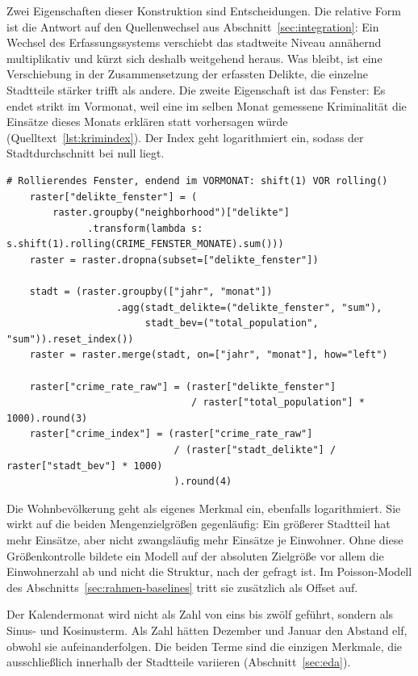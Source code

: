Zwei Eigenschaften dieser Konstruktion sind Entscheidungen. Die relative Form
ist die Antwort auf den Quellenwechsel aus Abschnitt~\ref{sec:integration}: Ein
Wechsel des Erfassungssystems verschiebt das stadtweite Niveau annähernd
multiplikativ und kürzt sich deshalb weitgehend heraus. Was bleibt, ist eine
Verschiebung in der Zusammensetzung der erfassten Delikte, die einzelne
Stadtteile stärker trifft als andere. Die zweite Eigenschaft ist das Fenster:
Es endet strikt im Vormonat, weil eine im selben Monat gemessene Kriminalität
die Einsätze dieses Monats erklären statt vorhersagen würde
(Quelltext~\ref{lst:krimindex}). Der Index geht logarithmiert ein, sodass der
Stadtdurchschnitt bei null liegt.

\begin{lstlisting}[style=pythonstil,
  label={lst:krimindex},
  caption={Relativer Kriminalitätsindex je Stadtteil und Monat
           (\texttt{prep/s1\_daten.py}, Z.~465--488, gekürzt)}]
    # Rollierendes Fenster, endend im VORMONAT: shift(1) VOR rolling()
    raster["delikte_fenster"] = (
        raster.groupby("neighborhood")["delikte"]
              .transform(lambda s: s.shift(1).rolling(CRIME_FENSTER_MONATE).sum()))
    raster = raster.dropna(subset=["delikte_fenster"])

    stadt = (raster.groupby(["jahr", "monat"])
                   .agg(stadt_delikte=("delikte_fenster", "sum"),
                        stadt_bev=("total_population", "sum")).reset_index())
    raster = raster.merge(stadt, on=["jahr", "monat"], how="left")

    raster["crime_rate_raw"] = (raster["delikte_fenster"]
                                / raster["total_population"] * 1000).round(3)
    raster["crime_index"] = (raster["crime_rate_raw"]
                             / (raster["stadt_delikte"] / raster["stadt_bev"] * 1000)
                             ).round(4)
\end{lstlisting}

Die Wohnbevölkerung geht als eigenes Merkmal ein, ebenfalls logarithmiert. Sie
wirkt auf die beiden Mengenzielgrößen gegenläufig: Ein größerer Stadtteil hat
mehr Einsätze, aber nicht zwangsläufig mehr Einsätze je Einwohner. Ohne diese
Größenkontrolle bildete ein Modell auf der absoluten Zielgröße vor allem die
Einwohnerzahl ab und nicht die Struktur, nach der gefragt ist. Im
Poisson-Modell des Abschnitts~\ref{sec:rahmen-baselines} tritt sie zusätzlich
als Offset auf.

Der Kalendermonat wird nicht als Zahl von eins bis zwölf geführt, sondern als
Sinus- und Kosinusterm. Als Zahl hätten Dezember und Januar den Abstand elf,
obwohl sie aufeinanderfolgen. Die beiden Terme sind die einzigen Merkmale, die
ausschließlich innerhalb der Stadtteile variieren (Abschnitt~\ref{sec:eda}).

